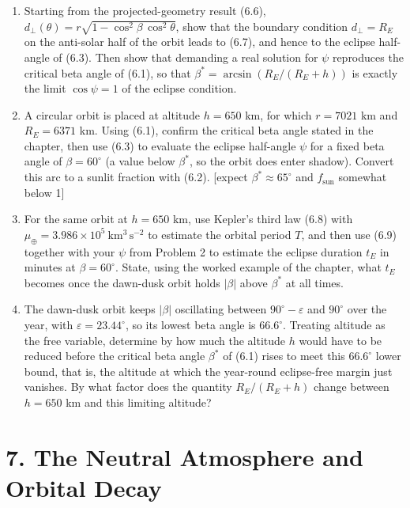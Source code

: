 \documentclass[
  11pt,
  openany,
  oneside]{book}
\begin{document}
\begin{enumerate}
\def\labelenumi{\arabic{enumi}.}
\item
  Starting from the projected-geometry result (6.6),
  \(d_\perp(\theta) = r\sqrt{1 - \cos^2\beta\,\cos^2\theta}\), show that
  the boundary condition \(d_\perp = R_E\) on the anti-solar half of the
  orbit leads to (6.7), and hence to the eclipse half-angle of (6.3).
  Then show that demanding a real solution for \(\psi\) reproduces the
  critical beta angle of (6.1), so that
  \(\beta^{*} = \arcsin(R_E/(R_E + h))\) is exactly the limit
  \(\cos\psi = 1\) of the eclipse condition.
\item
  A circular orbit is placed at altitude \(h = 650\) km, for which
  \(r = 7021\) km and \(R_E = 6371\) km. Using (6.1), confirm the
  critical beta angle stated in the chapter, then use (6.3) to evaluate
  the eclipse half-angle \(\psi\) for a fixed beta angle of
  \(\beta = 60^\circ\) (a value below \(\beta^{*}\), so the orbit does
  enter shadow). Convert this arc to a sunlit fraction with (6.2).
  {[}expect \(\beta^{*} \approx 65^\circ\) and \(f_{\mathrm{sun}}\)
  somewhat below 1{]}
\item
  For the same orbit at \(h = 650\) km, use Kepler's third law (6.8)
  with \(\mu_\oplus = 3.986 \times 10^{5}\ \mathrm{km^3\,s^{-2}}\) to
  estimate the orbital period \(T\), and then use (6.9) together with
  your \(\psi\) from Problem 2 to estimate the eclipse duration \(t_E\)
  in minutes at \(\beta = 60^\circ\). State, using the worked example of
  the chapter, what \(t_E\) becomes once the dawn-dusk orbit holds
  \(|\beta|\) above \(\beta^{*}\) at all times.
\item
  The dawn-dusk orbit keeps \(|\beta|\) oscillating between
  \(90^\circ - \varepsilon\) and \(90^\circ\) over the year, with
  \(\varepsilon = 23.44^\circ\), so its lowest beta angle is
  \(66.6^\circ\). Treating altitude as the free variable, determine by
  how much the altitude \(h\) would have to be reduced before the
  critical beta angle \(\beta^{*}\) of (6.1) rises to meet this
  \(66.6^\circ\) lower bound, that is, the altitude at which the
  year-round eclipse-free margin just vanishes. By what factor does the
  quantity \(R_E/(R_E + h)\) change between \(h = 650\) km and this
  limiting altitude?
\end{enumerate}

\chapter{7. The Neutral Atmosphere and Orbital
Decay}\label{the-neutral-atmosphere-and-orbital-decay}
\end{document}
